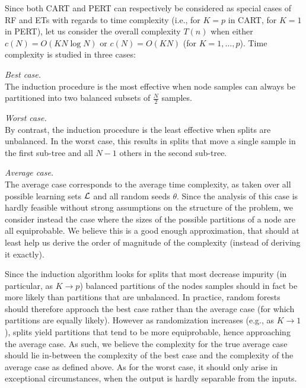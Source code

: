 Since both CART and PERT can respectively be considered as special cases of RF
and ETs with regards to time complexity (i.e., for $K=p$ in CART, for $K=1$ in
PERT), let us consider the overall complexity $T(n)$ when either
$c(N)=O(KN\log N)$ or $c(N)=O(KN)$ (for $K=1,\dots,p$). Time complexity
is studied in three cases:

\begin{description}
\item \textit{Best case.}\hfill\\
      The induction procedure is the most effective
      when node samples can always be partitioned into two balanced subsets of $\tfrac{N}{2}$
      samples.

\item \textit{Worst case.}\hfill\\
      By contrast, the induction procedure is the least
      effective when splits are unbalanced. In the worst case,
      this results in splits that move a single sample in the first sub-tree and
      all $N-1$ others in the second sub-tree.

\item \textit{Average case.}\hfill\\
      The average case corresponds to the average time
      complexity, as taken over all possible learning sets ${\cal L}$ and
      all random seeds $\theta$.  Since the analysis of this case is hardly
      feasible without strong assumptions on the structure of the problem,
      we consider instead the case where the sizes of the possible
      partitions of a node are all equiprobable. We believe this is a good
      enough approximation, that should at least help us derive the order
      of magnitude of the complexity (instead of deriving it exactly).

\end{description}

Since the induction algorithm looks for splits that most decrease impurity (in
particular, as $K\to p$) balanced partitions of the nodes samples should in
fact be more likely than partitions that are unbalanced. In practice, random
forests should therefore approach the best case rather than the average case
(for which partitions are equally likely). However as randomization increases
(e.g., as $K \to 1$), splits yield partitions that tend to be more
equiprobable, hence approaching the average case. As such, we believe the
complexity for the true average case should lie in-between the complexity of
the best case and the complexity of the average case as defined above. As for
the worst case, it should only arise in exceptional circumstances, when the
output is hardly separable from the inputs.

